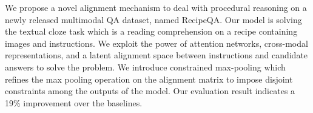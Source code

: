 We propose a novel alignment mechanism to deal with procedural reasoning on a newly released multimodal QA dataset, named RecipeQA. Our model is solving the textual cloze task which is a reading comprehension on a recipe containing images and instructions. We exploit the power of attention networks, cross-modal representations, and a latent alignment space between instructions and candidate answers to solve the problem. We introduce constrained max-pooling which refines the max pooling operation on the alignment matrix to impose disjoint constraints among the outputs of the model. Our evaluation result indicates a 19\% improvement over the baselines.
